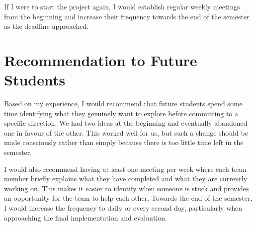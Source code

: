 \documentclass[runningheads]{llncs}
\begin{document}
If I were to start the project again, I would establish regular weekly
meetings from the beginning and increase their frequency towards the end
of the semester as the deadline approached.

\section{Recommendation to Future Students}

Based on my experience, I would recommend that future students spend
some time identifying what they genuinely want to explore before
committing to a specific direction. We had two ideas at the beginning
and eventually abandoned one in favour of the other. This worked well
for us, but such a change should be made consciously rather than simply
because there is too little time left in the semester.

I would also recommend having at least one meeting per week where each
team member briefly explains what they have completed and what they are
currently working on. This makes it easier to identify when someone is
stuck and provides an opportunity for the team to help each other. Towards
the end of the semester, I would increase the frequency to daily or every
second day, particularly when approaching the final implementation and
evaluation.
\end{document}
